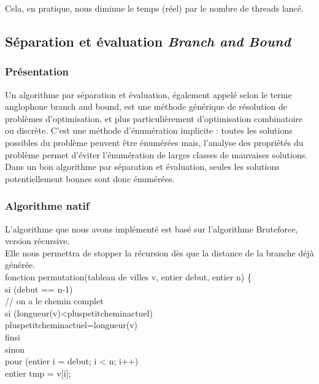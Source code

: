 \documentclass[12pt]{report}
\begin{document}
{{{{   Cela, en pratique, nous diminue le temps (réel) par le nombre de threads lancé. \\
\subsection{Séparation et évaluation \textit{Branch and Bound}}

\subsubsection{Présentation}

Un algorithme par séparation et évaluation, également appelé selon le terme anglophone branch and bound, est une méthode générique de résolution de problèmes d'optimisation, et plus particulièrement d'optimisation combinatoire ou discrète. C'est une méthode d'énumération implicite : toutes les solutions possibles du problème peuvent être énumérées mais, l'analyse des propriétés du problème permet d'éviter l'énumération de larges classes de mauvaises solutions. Dans un bon algorithme par séparation et évaluation, seules les solutions potentiellement bonnes sont donc énumérées.

\subsubsection{Algorithme natif}

L'algorithme que nous avons implémenté est basé sur l'algorithme Bruteforce, version récursive. \\
Elle nous permettra de stopper la récursion dès que la distance de la branche déjà générée. \\

fonction permutation(tableau de villes v, entier debut, entier n)
\{  \\
\indent si (debut == n-1) { \\
\indent \indent  // on a le chemin complet\\
\indent\indent si (longueur(v)<pluspetitcheminactuel) \\
\indent\indent\indent pluspetitcheminactuel=longueur(v) \\
\indent\indent finsi\\
\indent sinon {\\
\indent \indent pour (entier i = debut; i < n; i++) {\\
\indent \indent \indent entier tmp = v[i];\\
      
}}}}}}}
\end{document}
